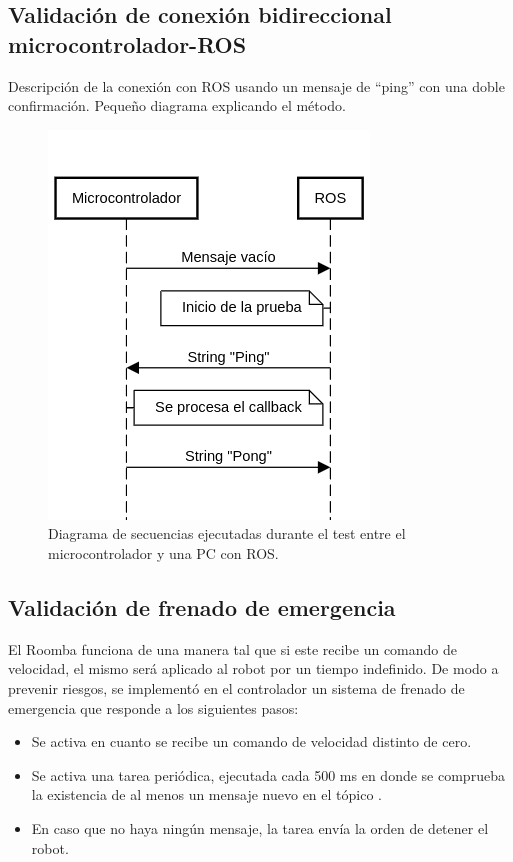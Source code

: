 \subsection{Validación de conexión bidireccional microcontrolador-ROS}

Descripción de la conexión con ROS usando un mensaje de ``ping'' con una doble confirmación. Pequeño diagrama explicando el método.

\begin{figure}[ht]
    \centering
    \includegraphics[scale=0.6]{./Figures/comm_test1.png}
    \caption{Diagrama de secuencias ejecutadas durante el test entre el microcontrolador y una PC con ROS.}
    \label{fig:secMicroROS}
\end{figure}

\subsection{Validación de frenado de emergencia}

El Roomba funciona de una manera tal que si este recibe un comando de velocidad, el mismo será aplicado al robot por un tiempo indefinido. De modo a prevenir riesgos, se implementó en el controlador un sistema de frenado de emergencia que responde a los siguientes pasos:

\begin{itemize}
    \item Se activa en cuanto se recibe un comando de velocidad distinto de cero.
    \item Se activa una tarea periódica, ejecutada cada 500 ms en donde se comprueba la existencia de al menos un mensaje nuevo en el tópico .
    \item En caso que no haya ningún mensaje, la tarea envía la orden de detener el robot.
\end{itemize}

